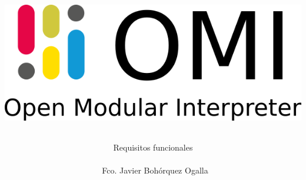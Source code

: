 \documentclass[12pt, spanish]{article}
\author{Requisitos funcionales\\\\\ Fco. Javier Bohórquez Ogalla}						%
\date{}														%
\title{ 
\begin{center}
\includegraphics[scale=0.5]{logo-doc.png}
\end{center} 
}
\begin{document}
\maketitle
\pagebreak
\tableofcontents
\pagebreak

\end{document}
